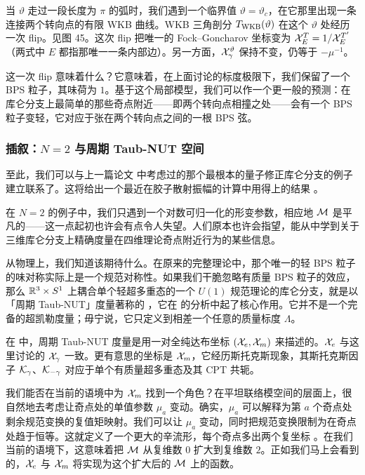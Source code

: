 当 $\vartheta$ 走过一段长度为 $\pi$ 的弧时，我们遇到一个临界值 $\vartheta = \vartheta_c$，在它那里出现一条连接两个转向点的有限 WKB 曲线。WKB 三角剖分 $T_{\rm WKB}(\vartheta)$ 在这个 $\vartheta$ 处经历一次 flip。见图 45。这次 flip 把唯一的 Fock–Goncharov 坐标变为 $\mathcal{X}^T_{E} = 1/\mathcal{X}^{T'}_{E}$（两式中 $E$ 都指那唯一一条内部边）。另一方面，$\mathcal{X}^\vartheta_\gamma$ 保持不变，仍等于 $-\mu^{-1}$。


这一次 flip 意味着什么？它意味着，在上面讨论的标度极限下，我们保留了一个 BPS 粒子，其味荷为 $1$。基于这个局部模型，我们可以作一个更一般的预测：在库仑分支上最简单的那些奇点附近——即两个转向点相撞之处——会有一个 BPS 粒子变轻，它对应于张在两个转向点之间的一根 BPS 弦。


\subsubsection{插叙：$N=2$ 与周期 Taub-NUT 空间} \label{sec:pnut}

至此，我们可以与上一篇论文 \cite{Gaiotto:2008cd} 中考虑过的那个最根本的量子修正库仑分支的例子建立联系了。这将给出一个最近在胶子散射振幅的计算中用得上的结果 \cite{Alday:2009yn}。

在 $N=2$ 的例子中，我们只遇到一个对数可归一化的形变参数，相应地 $\mathcal{M}$ 是平凡的——这一点起初也许会有点令人失望。人们原本也许会指望，能从中学到关于三维库仑分支上精确度量在四维理论奇点附近行为的某些信息。

从物理上，我们知道该期待什么。在原来的完整理论中，那个唯一的轻 BPS 粒子的味对称实际上是一个规范对称性。如果我们干脆忽略有质量 BPS 粒子的效应，那么 $\mathbb{R}^3 \times S^1$ 上耦合单个轻超多重态的一个 $U(1)$ 规范理论的库仑分支，就是以「周期 Taub-NUT」度量著称的 \cite{Ooguri:1996me,Seiberg:1996ns}，它在 \cite{Gaiotto:2008cd} 的分析中起了核心作用。它并不是一个完备的超凯勒度量；毋宁说，它只定义到相差一个任意的质量标度 $\Lambda$。

在 \cite{Gaiotto:2008cd} 中，周期 Taub-NUT 度量是用一对全纯达布坐标 $(\mathcal{X}_e, \mathcal{X}_m)$ 来描述的。$\mathcal{X}_e$ 与这里讨论的 $\mathcal{X}_\gamma$ 一致。更有意思的坐标是 $\mathcal{X}_m$，它经历斯托克斯现象，其斯托克斯因子 $\mathcal{K}_\gamma$、$\mathcal{K}_{-\gamma}$ 对应于单个有质量超多重态及其 CPT 共轭。

我们能否在当前的语境中为 $\mathcal{X}_m$ 找到一个角色？在平坦联络模空间的层面上，很自然地去考虑让奇点处的单值参数 $\mu_a$ 变动。确实，$\mu_a$ 可以解释为第 $a$ 个奇点处剩余规范变换的复值矩映射。我们可以让 $\mu_a$ 变动，同时把规范变换限制为在奇点处趋于恒等。这就定义了一个更大的辛流形，每个奇点多出两个复坐标 \cite{MR1864833}。在我们当前的语境下，这意味着把 $\mathcal{M}$ 从复维数 $0$ 扩大到复维数 $2$。正如我们马上会看到的，$\mathcal{X}_e$ 与 $\mathcal{X}_m$ 将实现为这个扩大后的 $\mathcal{M}$ 上的函数。

